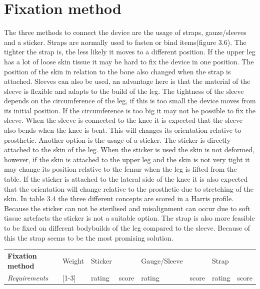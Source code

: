 \documentclass[whitelogo]{tudelft-report}
\begin{document}
{{{\section{Fixation method}
The three methods to connect the device are the usage of straps, gauze/sleeves and a sticker. Straps are normally used to fasten or bind items(figure 3.6). The tighter the strap is, the less likely it moves to a different position. If the upper leg has a lot of loose skin tissue it may be hard to fix the device in one position. The position of the skin in relation to the bone also changed when the strap is attached. 
Sleeves can also be used, an advantage here is that the material of the sleeve is flexible and adapts to the build of the leg. The tightness of the sleeve depends on the circumference of the leg, if this is too small the device moves from its initial position. If the circumference is too big it may not be possible to fix the sleeve. When the sleeve is connected to the knee it is expected that the sleeve also bends when the knee is bent. This will changes its orientation relative to prosthetic. Another option is the usage of a sticker. The sticker is directly attached to the skin of the leg. When the sticker is used the skin is not deformed, however, if the skin is attached to the upper leg and the skin is not very tight it may change its position relative to the femur when the leg is lifted from the table. If the sticker is attached to the lateral side of the knee it is also expected that the orientation will change relative to the prosthetic due to stretching of the skin. In table 3.4 the three different concepts are scored in a Harris profile. Because the sticker can not be sterilised and misalignment can occur due to soft tissue artefacts\cite{kratzenstein2012effective} the sticker is not a suitable option. The strap is also more feasible to be fixed on different bodybuilds of the leg compared to the sleeve. Because of this the strap seems to be the most promising solution. 
\begin{table}[!tbh]
	\begin{tabular}{|ll|ll|ll|ll|}
		\hline
		\multicolumn{1}{|l|}{\textbf{Fixation method}}     & Weight    & Sticker                       &       & Gauge/Sleeve                       &       & Strap              &       \\ \cline{1-1}
		\multicolumn{1}{|l|}{\textit{Requirements}} & {[}1-3{]} & \multicolumn{1}{l|}{rating} & score & \multicolumn{1}{l|}{rating} & score & \multicolumn{1}{l|}{rating} & score \\ \hline

\end{tabular}
\end{table}}}}
\end{document}
